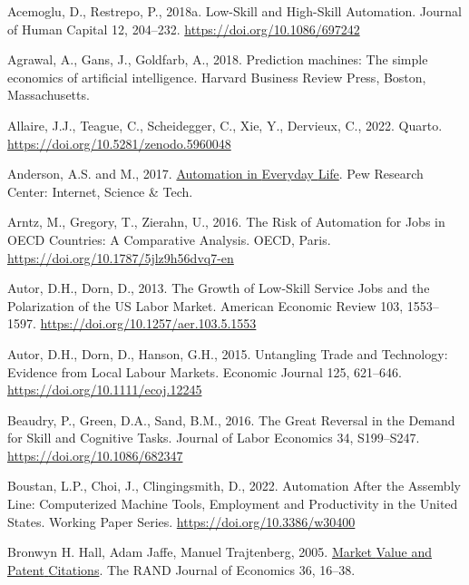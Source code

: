 \documentclass[
  12pt,
  a4paperpaper,
]{article}
\newlength{\cslhangindent}
\newenvironment{CSLReferences}[2] %
 {\begin{list}{}{%
  \setlength{\itemindent}{0pt}
  \setlength{\leftmargin}{0pt}
  \setlength{\parsep}{0pt}
  \ifodd #1
   \setlength{\leftmargin}{\cslhangindent}
   \setlength{\itemindent}{-1\cslhangindent}
  \fi
  \setlength{\itemsep}{#2\baselineskip}}}
 {\end{list}}
\begin{document}
\begin{CSLReferences}{1}{0}
Acemoglu, D., Restrepo, P., 2018a. Low-{Skill} and {High}-{Skill}
{Automation}. Journal of Human Capital 12, 204--232.
\url{https://doi.org/10.1086/697242}

Agrawal, A., Gans, J., Goldfarb, A., 2018. Prediction machines: The
simple economics of artificial intelligence. Harvard Business Review
Press, Boston, Massachusetts.

Allaire, J.J., Teague, C., Scheidegger, C., Xie, Y., Dervieux, C., 2022.
Quarto. \url{https://doi.org/10.5281/zenodo.5960048}

Anderson, A.S. and M., 2017.
\href{https://www.pewresearch.org/internet/2017/10/04/automation-in-everyday-life/}{Automation
in {Everyday} {Life}}. Pew Research Center: Internet, Science \& Tech.

Arntz, M., Gregory, T., Zierahn, U., 2016. The {Risk} of {Automation}
for {Jobs} in {OECD} {Countries}: {A} {Comparative} {Analysis}. OECD,
Paris. \url{https://doi.org/10.1787/5jlz9h56dvq7-en}

Autor, D.H., Dorn, D., 2013. The {Growth} of {Low}-{Skill} {Service}
{Jobs} and the {Polarization} of the {US} {Labor} {Market}. American
Economic Review 103, 1553--1597.
\url{https://doi.org/10.1257/aer.103.5.1553}

Autor, D.H., Dorn, D., Hanson, G.H., 2015. Untangling {Trade} and
{Technology}: {Evidence} from {Local} {Labour} {Markets}. Economic
Journal 125, 621--646. \url{https://doi.org/10.1111/ecoj.12245}

Beaudry, P., Green, D.A., Sand, B.M., 2016. The {Great} {Reversal} in
the {Demand} for {Skill} and {Cognitive} {Tasks}. Journal of Labor
Economics 34, S199--S247. \url{https://doi.org/10.1086/682347}

Boustan, L.P., Choi, J., Clingingsmith, D., 2022. Automation {After} the
{Assembly} {Line}: {Computerized} {Machine} {Tools}, {Employment} and
{Productivity} in the {United} {States}. Working {Paper} {Series}.
\url{https://doi.org/10.3386/w30400}

Bronwyn H. Hall, Adam Jaffe, Manuel Trajtenberg, 2005.
\href{https://www.jstor.org/stable/1593752}{Market {Value} and {Patent}
{Citations}}. The RAND Journal of Economics 36, 16--38.


\end{CSLReferences}
\end{document}

